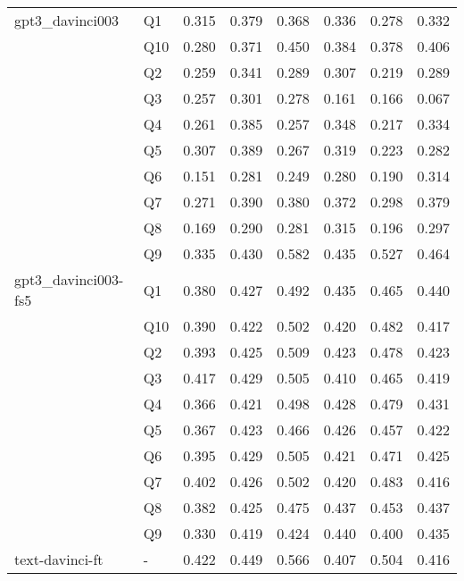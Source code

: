 \begin{tabular}{llrrrrrr}
gpt3\_davinci003 & Q1 & 0.315 & 0.379 & 0.368 & 0.336 & 0.278 & 0.332 \\
                & Q10 & 0.280 & 0.371 & 0.450 & 0.384 & 0.378 & 0.406 \\
                & Q2 & 0.259 & 0.341 & 0.289 & 0.307 & 0.219 & 0.289 \\
                & Q3 & 0.257 & 0.301 & 0.278 & 0.161 & 0.166 & 0.067 \\
                & Q4 & 0.261 & 0.385 & 0.257 & 0.348 & 0.217 & 0.334 \\
                & Q5 & 0.307 & 0.389 & 0.267 & 0.319 & 0.223 & 0.282 \\
                & Q6 & 0.151 & 0.281 & 0.249 & 0.280 & 0.190 & 0.314 \\
                & Q7 & 0.271 & 0.390 & 0.380 & 0.372 & 0.298 & 0.379 \\
                & Q8 & 0.169 & 0.290 & 0.281 & 0.315 & 0.196 & 0.297 \\
                & Q9 & 0.335 & 0.430 & 0.582 & 0.435 & 0.527 & 0.464 \\
gpt3\_davinci003-fs5 & Q1 & 0.380 & 0.427 & 0.492 & 0.435 & 0.465 & 0.440 \\
                & Q10 & 0.390 & 0.422 & 0.502 & 0.420 & 0.482 & 0.417 \\
                & Q2 & 0.393 & 0.425 & 0.509 & 0.423 & 0.478 & 0.423 \\
                & Q3 & 0.417 & 0.429 & 0.505 & 0.410 & 0.465 & 0.419 \\
                & Q4 & 0.366 & 0.421 & 0.498 & 0.428 & 0.479 & 0.431 \\
                & Q5 & 0.367 & 0.423 & 0.466 & 0.426 & 0.457 & 0.422 \\
                & Q6 & 0.395 & 0.429 & 0.505 & 0.421 & 0.471 & 0.425 \\
                & Q7 & 0.402 & 0.426 & 0.502 & 0.420 & 0.483 & 0.416 \\
                & Q8 & 0.382 & 0.425 & 0.475 & 0.437 & 0.453 & 0.437 \\
                & Q9 & 0.330 & 0.419 & 0.424 & 0.440 & 0.400 & 0.435 \\
text-davinci-ft & - & 0.422 & 0.449 & 0.566 & 0.407 & 0.504 & 0.416 \\
\bottomrule
\end{tabular}
